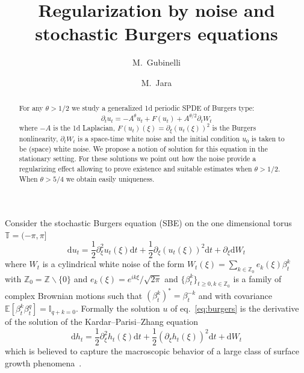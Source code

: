 \documentclass[11pt,a4paper,draft,reqno]{amsart}
\newcommand{\TT}{\mathbb{T}}
\newcommand{\II}{\mathbb{I}}
\newcommand{\ZZ}{\mathbb{Z}}
\newcommand{\expect}{\mathbb{E}}
\newcommand{\dd}{\mathrm{d}}
\begin{document}
\title[Regularization for SBE]{Regularization by noise and \\  stochastic Burgers equations}
\author{M.~Gubinelli}
\address[M.~Gubinelli]{CEREMADE  UMR 7534 -- Universit\'e Paris--Dauphine}
\author{M.~Jara}
\address[M.~Jara]{IMPA\\
Estrada Dona Castorina 110\\
CEP 22460-320\\
Rio de Janeiro\\
Brazil}

\begin{abstract}
For any $\theta > 1/2$ we study a generalized 1d periodic SPDE of Burgers type:
$$
\partial_t u_t =- A^\theta u_t  + F(u_t)  + A^{\theta/2} \partial_t W_t 
$$
where $-A$ is the 1d Laplacian,  $F(u_t)(\xi)=\partial_\xi (u_t(\xi))^2$ is the Burgers nonlinearity, $\partial_t W_t$ is a space-time white noise and  the initial condition $u_0$ is taken to be (space) white noise. We propose a notion of solution for this equation in the stationary setting. For these solutions we point out how the noise provide a regularizing effect allowing to prove existence and suitable estimates when $\theta>1/2$. When $\theta>5/4$ we obtain easily uniqueness. 
\end{abstract}

\maketitle

Consider the stochastic Burgers equation (SBE) on the one dimensional torus $\TT=(-\pi,\pi]$
\begin{equation}
\label{eq:burgers}
\dd u_t = \frac12 \partial_\xi^2 u_t(\xi) \dd t + \frac12 \partial_\xi (u_t(\xi))^2 \dd t + \partial_\xi \dd W_t 
\end{equation}
where $W_t$ is a cylindrical white noise of the form
$
W_t(\xi) = \sum_{k\in\ZZ_0} e_k(\xi) \beta^k_t
$
with $\ZZ_0 = \ZZ\backslash \{0\}$ and $e_k(\xi)=e^{i k\xi}/\sqrt{2\pi}$ and $\{\beta_t^k\}_{t\ge 0, k\in\ZZ_0}$ is a family of complex Brownian motions such that $(\beta^k_t)^*=\beta^{-k}_t$ and with covariance $\expect[\beta_t^k \beta_t^q ]=\II_{q+k=0}$.   Formally the solution $u$ of eq.~\eqref{eq:burgers} is the derivative of the solution  of the Kardar--Parisi--Zhang equation
\begin{equation}
\label{eq:kpz}
\dd h_t = \frac12 \partial_\xi^2 h_t(\xi) \dd t + \frac12  (\partial_\xi h_t(\xi))^2 \dd t +  \dd W_t 
\end{equation}
which is believed to capture the macroscopic behavior of a large class of surface growth phenomena~\cite{KPZ}.
\end{document}

